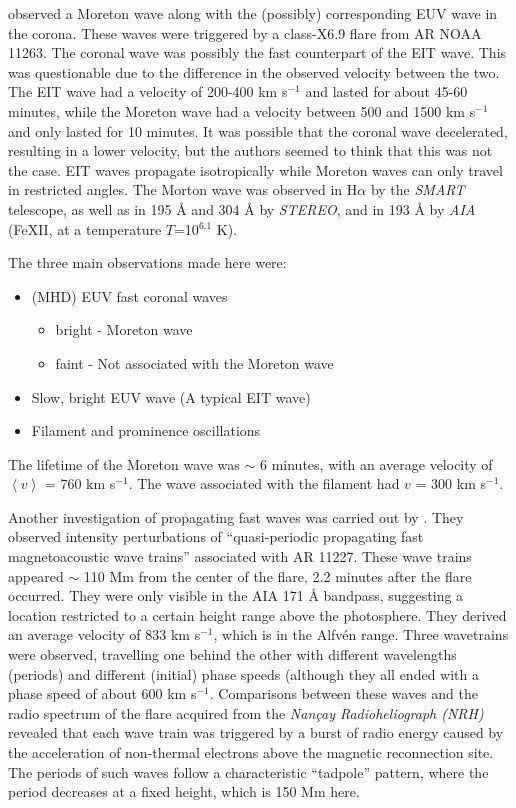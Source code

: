 \documentclass[preprint2]{aastex}
\begin{document}
\cite{pfw_1} observed a Moreton wave along with the (possibly)
corresponding EUV wave in the corona. These waves were triggered by
a class-X6.9 flare from AR NOAA 11263. The coronal wave was possibly
the fast counterpart of the EIT wave. This was questionable due to
the difference in the observed velocity between the two.
The EIT wave had a velocity of 200-400 km s$^{-1}$ and lasted for
about 45-60 minutes, while the Moreton wave had a velocity between 500 and
1500 km s$^{-1}$ and only lasted for 10 minutes. It was possible
that the coronal wave decelerated, resulting in a lower velocity, but
the authors seemed to think that this was not the case.
EIT waves propagate isotropically while Moreton waves can only
travel in restricted angles. The Morton wave was observed in
H$\alpha$ by the \emph{SMART} telescope, as well as in 195 \AA{}
and 304 \AA{} by \emph{STEREO}, and in 193 \AA{} by \emph{AIA}
(Fe{\footnotesize XII}, at a temperature $T$=10$^{6.1}$ K).

The three main observations made here were:
\begin{itemize}
    \item (MHD) EUV fast coronal waves
        \begin{itemize}
            \item bright - Moreton wave
            \item faint - Not associated with the Moreton wave
        \end{itemize}
    \item Slow, bright EUV wave (A typical EIT wave)
    \item Filament and prominence oscillations
\end{itemize}
The lifetime of the Moreton wave was $\sim$ 6 minutes, with an average
velocity of $\left\langle v \right\rangle$ = 760 km s$^{-1}$.
The wave associated with the filament had $v$ = 300 km s$^{-1}$.


Another investigation of propagating fast waves was carried out by
\cite{pfw_2}.
They observed intensity perturbations of ``quasi-periodic propagating fast
magnetoacoustic wave trains'' associated with AR 11227.
These wave trains appeared $\sim$ 110 Mm from the center of the flare,
2.2 minutes after the flare occurred.
They were only visible in the AIA 171 \AA{} bandpass, suggesting a
location restricted to a certain height range above the photosphere.
They derived an average velocity of
833 km s$^{-1}$, which is in the Alfv\'en range.
Three wavetrains were observed, travelling one behind the other
with different wavelengths (periods) and different (initial) phase
speeds (although they all ended with a phase speed of about 600 km s$^{-1}$.
Comparisons between these waves and the radio spectrum of the flare
acquired from the \emph{Nan\c{c}ay Radioheliograph (NRH)}
revealed that each wave train was triggered by a burst of radio energy
caused by the acceleration of non-thermal electrons above the
magnetic reconnection site. The periods of such waves follow a
characteristic ``tadpole'' pattern, where the period decreases at
a fixed height, which is 150 Mm here.
\end{document}
